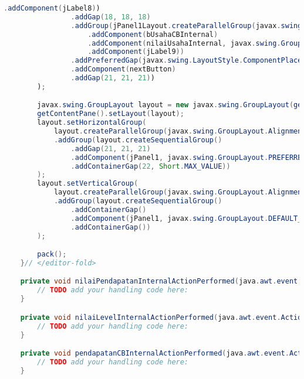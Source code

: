 \begin{lstlisting}[language=Java, caption=TampilanBobotKetetanggaan.java]
                    .addComponent(jLabel8))
                .addGap(18, 18, 18)
                .addGroup(jPanel1Layout.createParallelGroup(javax.swing.GroupLayout.Alignment.BASELINE)
                    .addComponent(bUsahaCBInternal)
                    .addComponent(nilaiUsahaInternal, javax.swing.GroupLayout.PREFERRED_SIZE, javax.swing.GroupLayout.DEFAULT_SIZE, javax.swing.GroupLayout.PREFERRED_SIZE)
                    .addComponent(jLabel9))
                .addPreferredGap(javax.swing.LayoutStyle.ComponentPlacement.RELATED, 26, Short.MAX_VALUE)
                .addComponent(nextButton)
                .addGap(21, 21, 21))
        );

        javax.swing.GroupLayout layout = new javax.swing.GroupLayout(getContentPane());
        getContentPane().setLayout(layout);
        layout.setHorizontalGroup(
            layout.createParallelGroup(javax.swing.GroupLayout.Alignment.LEADING)
            .addGroup(layout.createSequentialGroup()
                .addGap(21, 21, 21)
                .addComponent(jPanel1, javax.swing.GroupLayout.PREFERRED_SIZE, javax.swing.GroupLayout.DEFAULT_SIZE, javax.swing.GroupLayout.PREFERRED_SIZE)
                .addContainerGap(22, Short.MAX_VALUE))
        );
        layout.setVerticalGroup(
            layout.createParallelGroup(javax.swing.GroupLayout.Alignment.LEADING)
            .addGroup(layout.createSequentialGroup()
                .addContainerGap()
                .addComponent(jPanel1, javax.swing.GroupLayout.DEFAULT_SIZE, javax.swing.GroupLayout.DEFAULT_SIZE, Short.MAX_VALUE)
                .addContainerGap())
        );

        pack();
    }// </editor-fold>                        

    private void nilaiPendapatanInternalActionPerformed(java.awt.event.ActionEvent evt) {                                                        
        // TODO add your handling code here:
    }                                                       

    private void nilaiLevelInternalActionPerformed(java.awt.event.ActionEvent evt) {                                                   
        // TODO add your handling code here:
    }                                                  

    private void pendapatanCBInternalActionPerformed(java.awt.event.ActionEvent evt) {                                                     
        // TODO add your handling code here:
    }                                                    


\end{lstlisting}
